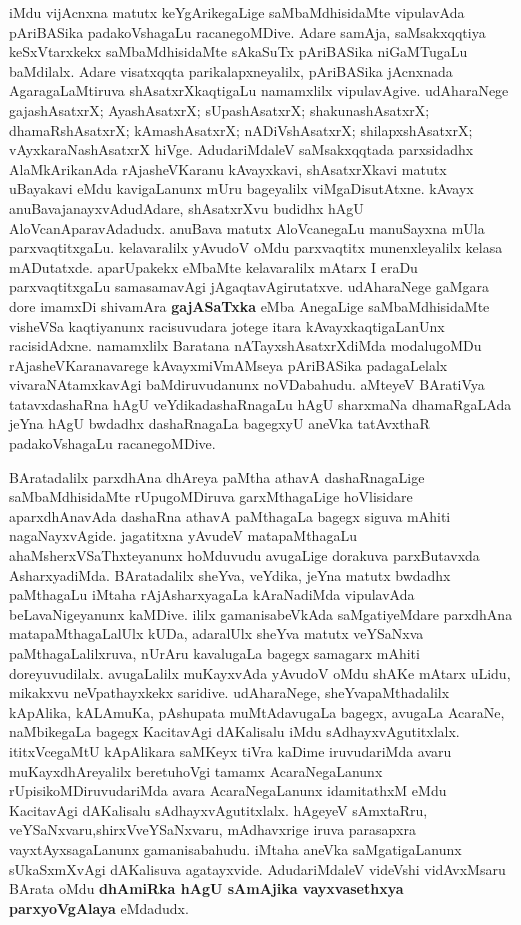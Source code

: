 iMdu vijAcnxna matutx keYgArikegaLige saMbaMdhisidaMte vipulavAda pAriBASika padakoVshagaLu racanegoMDive. Adare samAja, saMsakxqqtiya keSxVtarxkekx saMbaMdhisidaMte sAkaSuTx pAriBASika niGaMTugaLu baMdilalx. Adare visatxqqta parikalapxneyalilx, pAriBASika jAcnxnada AgaragaLaMtiruva shAsatxrXkaqtigaLu namamxlilx vipulavAgive. udAharaNege gajashAsatxrX; AyashAsatxrX; sUpashAsatxrX; shakunashAsatxrX; dhamaRshAsatxrX; kAmashAsatxrX; nADiVshAsatxrX; shilapxshAsatxrX; vAyxkaraNashAsatxrX hiVge. AdudariMdaleV saMsakxqqtada parxsidadhx AlaMkArikanAda rAjasheVKaranu kAvayxkavi, shAsatxrXkavi matutx uBayakavi eMdu kavigaLanunx mUru bageyalilx viMgaDisutAtxne. kAvayx anuBavajanayxvAdudAdare, shAsatxrXvu budidhx hAgU AloVcanAparavAdadudx. anuBava matutx AloVcanegaLu manuSayxna mUla parxvaqtitxgaLu. kelavaralilx yAvudoV oMdu parxvaqtitx munenxleyalilx kelasa mADutatxde. aparUpakekx eMbaMte kelavaralilx mAtarx I eraDu parxvaqtitxgaLu samasamavAgi jAgaqta\-vAgirutatxve. udAharaNege gaMgara dore imamxDi shivamAra \textbf{gajASaTxka} eMba AnegaLige saMbaMdhisidaMte visheVSa kaqtiyanunx racisuvudara jotege itara kAvayxkaqtigaLanUnx racisidAdxne. namamxlilx Baratana nATayxshAsatxrXdiMda modalugoMDu rAjasheVKaranavarege kAvayx\-miVmAMseya pAriBASika padagaLelalx vivaraNAtamxkavAgi baMdiruvudanunx noVDabahudu. aMteyeV BAratiVya tatavxdashaRna hAgU veYdikadashaRnagaLu hAgU sharxmaNa dhamaRgaLAda jeYna hAgU bwdadhx dashaRnagaLa bagegxyU aneVka tatAvxthaR padakoVshagaLu racanegoMDive.

BAratadalilx parxdhAna dhAreya paMtha athavA dashaRnagaLige saMbaMdhisidaMte rUpugoMDiruva garxMthagaLige hoVlisidare aparxdhAna\-vAda dashaRna athavA paMthagaLa bagegx siguva mAhiti nagaNayxvAgide. jagatitxna yAvudeV matapaMthagaLu ahaMsherxVSaThxteyanunx hoMduvudu avugaLige dorakuva parxButavxda AsharxyadiMda. BAratadalilx sheYva, veYdika, jeYna matutx bwdadhx paMthagaLu iMtaha rAjA\-sharxyagaLa kAraNadiMda vipulavAda beLavaNigeyanunx kaMDive. ililx gamanisabeVkAda saMgatiyeMdare parxdhAna matapaMthagaLalUlx kUDa, adaralUlx sheYva matutx veYSaNxva paMthagaLalilxruva, nUrAru kavalugaLa bagegx samagarx mAhiti doreyuvudilalx. avugaLalilx muKayxvAda yAvudoV oMdu shAKe mAtarx  uLidu, mikakxvu neVpathayxkekx saridive. udAharaNege, sheYvapaMthadalilx kApAlika, kALAmuKa, pAshupata muMtAdavugaLa bagegx, avugaLa AcaraNe, naMbikegaLa bagegx KacitavAgi dAKalisalu iMdu sAdhayxvAgutitxlalx. ititxVcegaMtU kApAlikara saMKeyx tiVra kaDime iruvudariMda avaru muKayxdhAreyalilx beretuhoVgi tamamx AcaraNegaLanunx rUpisikoMDiruvudariMda avara AcaraNegaLanunx idamitathxM eMdu KacitavAgi dAKalisalu sAdhayxvAgutitxlalx. hAgeyeV sAmxtaRru, veYSaNxvaru,\break shirxVveYSaNxvaru, mAdhavxrige iruva parasapxra vayxtAyxsagaLanunx gamanisabahudu. iMtaha aneVka saMgatigaLanunx sUkaSxmXvAgi dAKalisuva agatayxvide. AdudariMdaleV videVshi vidAvxMsaru BArata oMdu \textbf{dhAmiRka hAgU sAmAjika vayxvasethxya parxyoVgAlaya} eMdadudx. 

